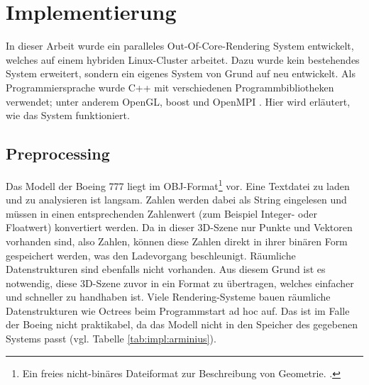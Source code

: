 
\chapter{Implementierung}
\label{chap:impl}
%

In dieser Arbeit wurde ein paralleles Out-Of-Core-Rendering System entwickelt, welches auf einem hybriden Linux-Cluster arbeitet. Dazu wurde kein bestehendes System erweitert, sondern ein eigenes System von Grund auf neu entwickelt. Als Programmiersprache wurde C++ mit verschiedenen Programmbibliotheken verwendet; unter anderem OpenGL, boost und OpenMPI \cite{mpi}. Hier wird erläutert, wie das System funktioniert.\\

\section{Preprocessing}
\label{sec:impl:preprocessing}
Das Modell der Boeing 777 liegt im OBJ-Format\footnote{Ein freies nicht-binäres Dateiformat zur Beschreibung von Geometrie. \cite{obj}. } vor. Eine Textdatei zu laden und zu analysieren ist langsam. Zahlen werden dabei als String eingelesen und müssen in einen entsprechenden Zahlenwert (zum Beispiel Integer- oder Floatwert) konvertiert werden. Da in dieser 3D-Szene nur Punkte und Vektoren vorhanden sind, also Zahlen, können diese Zahlen direkt in ihrer binären Form gespeichert werden, was den Ladevorgang beschleunigt. Räumliche Datenstrukturen sind ebenfalls nicht vorhanden. Aus diesem Grund ist es notwendig, diese 3D-Szene zuvor in ein Format zu übertragen, welches einfacher und schneller zu handhaben ist. Viele Rendering-Systeme bauen räumliche Datenstrukturen wie Octrees beim Programmstart ad hoc auf. Das ist im Falle der Boeing nicht praktikabel, da das Modell nicht in den Speicher des gegebenen Systems passt (vgl. Tabelle \ref{tab:impl:arminius}).

